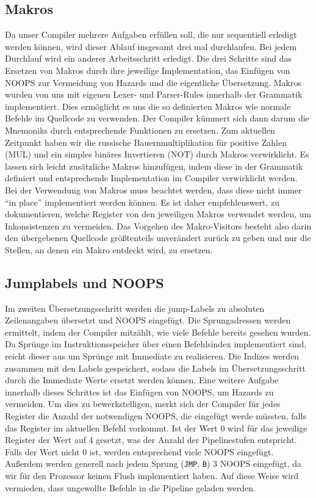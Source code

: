 \documentclass[paper=a4,fontsize=12pt,twocolumn]{scrreprt}
\begin{document}
\subsection{Makros}
Da unser Compiler mehrere Aufgaben erfüllen soll, die nur sequentiell erledigt werden können, wird dieser Ablauf insgesamt drei mal durchlaufen.
Bei jedem Durchlauf wird ein anderer Arbeitsschritt erledigt.
Die drei Schritte sind das Ersetzen von Makros durch ihre jeweilige Implementation, das Einfügen von NOOPS zur Vermeidung von Hazards und die eigentliche Übersetzung.
Makros wurden von uns mit eigenen Lexer- und Parser-Rules innerhalb der Grammatik implementiert.
Dies ermöglicht es uns die so definierten Makros wie normale Befehle im Quellcode zu verwenden.
Der Compiler kümmert sich dann darum die Mnemoniks durch entsprechende Funktionen zu ersetzen.
Zum aktuellen Zeitpunkt haben wir die russische Bauernmultiplikation für positive Zahlen (MUL) und ein simples binäres Invertieren (NOT) durch Makros verwirklicht.
Es lassen sich leicht zusätzliche Makros hinzufügen, indem diese in der Grammatik definiert  und entsprechende Implementation im Compiler verwirklicht werden.
Bei der Verwendung von Makros muss beachtet werden, dass diese nicht immer \enquote{in place} implementiert werden können.
Es ist daher empfehlenswert, zu dokumentieren, welche Register von den jeweiligen Makros verwendet werden, um Inkonsistenzen zu vermeiden.
Das Vorgehen des Makro-Visitors besteht also darin den übergebenen Quellcode größtenteils unverändert zurück zu geben und nur die Stellen, an denen ein Makro entdeckt wird, zu ersetzen.

\subsection{Jumplabels und NOOPS}
Im zweiten Übersetzungsschritt werden die jump-Labels zu absoluten Zeilenangaben übersetzt und NOOPS eingefügt.
Die Sprungadressen werden ermittelt, indem der Compiler mitzählt, wie viele Befehle bereits gesehen wurden.
Da Sprünge im Instruktionsspeicher über einen Befehlsindex implementiert sind, reicht dieser aus um Sprünge mit Immediate zu realisieren.
Die Indizes werden zusammen mit den Labels gespeichert, sodass die Labels im Übersetzungsschritt durch die Immediate Werte ersetzt werden können.
Eine weitere Aufgabe innerhalb dieses Schrittes ist das Einfügen von NOOPS, um Hazards zu vermeiden.
Um dies zu bewerkstelligen, merkt sich der Compiler für jedes Register die Anzahl der notwendigen NOOPS, die eingefügt werde müssten, falls das Register im aktuellen Befehl vorkommt.
Ist der Wert 0 wird für das jeweilige Register der Wert auf 4 gesetzt, was der Anzahl der Pipelinestufen entspricht.
Falls der Wert nicht 0 ist, werden entsprechend viele NOOPS eingefügt.
Außerdem werden generell nach jedem Sprung (\texttt{JMP}, \texttt{B}) 3 NOOPS eingefügt, da wir für den Prozessor keinen Flush implementiert haben.
Auf diese Weise wird vermieden, dass ungewollte Befehle in die Pipeline geladen werden.
\end{document}
